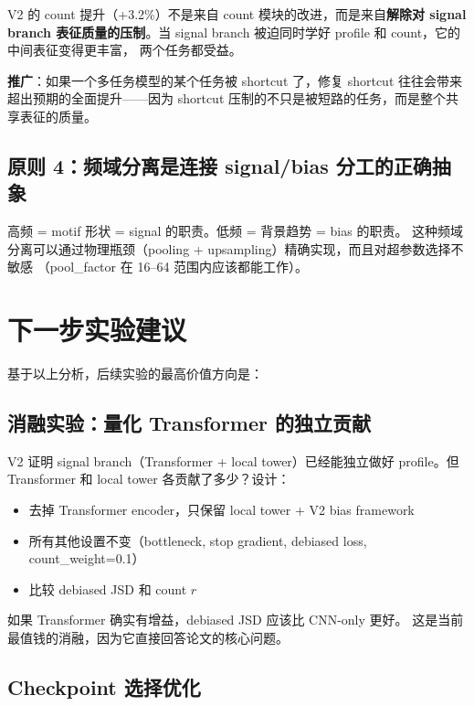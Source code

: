 \documentclass[11pt,a4paper]{ctexart}
\begin{document}
V2 的 count 提升（+3.2\%）不是来自 count 模块的改进，而是来自\textbf{解除对 signal branch
表征质量的压制}。当 signal branch 被迫同时学好 profile 和 count，它的中间表征变得更丰富，
两个任务都受益。

\textbf{推广}：如果一个多任务模型的某个任务被 shortcut 了，修复 shortcut 往往会带来
超出预期的全面提升——因为 shortcut 压制的不只是被短路的任务，而是整个共享表征的质量。

\subsection{原则 4：频域分离是连接 signal/bias 分工的正确抽象}

高频 = motif 形状 = signal 的职责。低频 = 背景趋势 = bias 的职责。
这种频域分离可以通过物理瓶颈（pooling + upsampling）精确实现，而且对超参数选择不敏感
（pool\_factor 在 16--64 范围内应该都能工作）。

\section{下一步实验建议}

基于以上分析，后续实验的最高价值方向是：

\subsection{消融实验：量化 Transformer 的独立贡献}

V2 证明 signal branch（Transformer + local tower）已经能独立做好 profile。但 Transformer 和
local tower 各贡献了多少？设计：
\begin{itemize}[leftmargin=2em]
  \item 去掉 Transformer encoder，只保留 local tower + V2 bias framework
  \item 所有其他设置不变（bottleneck, stop gradient, debiased loss, count\_weight=0.1）
  \item 比较 debiased JSD 和 count $r$
\end{itemize}

如果 Transformer 确实有增益，debiased JSD 应该比 CNN-only 更好。
这是当前最值钱的消融，因为它直接回答论文的核心问题。

\subsection{Checkpoint 选择优化}
\end{document}
